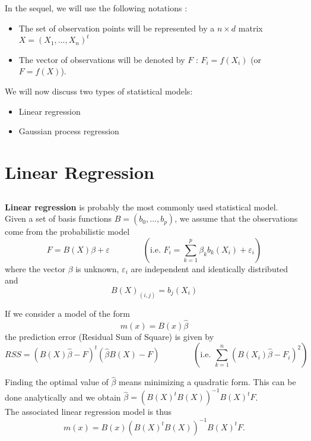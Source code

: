 \begin{frame}{}
In the sequel, we will use the following notations :
\begin{itemize}
	\item The set of observation points will be represented by a $n \times d$ matrix $X=(X_1, ..., X_n)^t$
	\item The vector of observations will be denoted by $F$ : $F_i=f(X_i)$ (or $F=f(X)$).
\end{itemize}
We will now discuss two types of statistical models:
\begin{itemize}
	\item Linear regression
	\item Gaussian process regression
\end{itemize}
\end{frame}

\section{Linear Regression}
\subsection{}

\begin{frame}{}
\textbf{Linear regression} is probably the most commonly used statistical model.\\ \vspace{3mm}
Given a set of basis functions $B=(b_0, \dots, b_p)$, we assume that the observations come from the probabilistic model
$$ F = B(X) \beta  + \varepsilon \qquad \qquad \left( \text{i.e. } F_i = \sum_{k=1}^p \beta_k b_k(X_i) + \varepsilon_i \right) $$
where the vector $\beta$ is unknown, $\varepsilon_i$ are independent and identically distributed and
$$ B(X)_{(i,j)}=b_j(X_i) $$
\end{frame}

\begin{frame}{}
If we consider a model of the form
$$m(x) = B(x) \hat{\beta}$$
the prediction error (Residual Sum of Square) is given by
$$RSS = (B(X) \hat{\beta}  - F)^t(\hat{\beta} B(X) - F)  \qquad \qquad \left( \text{i.e. } \sum_{k=1}^n ( B(X_i) \hat{\beta} - F_i)^2\right)$$

Finding the optimal value of $\hat{\beta}$ means minimizing a quadratic form. This can be done analytically and we obtain $\hat{\beta} = (B(X)^t B(X))^{-1} B(X)^t F$.\\
\vspace{3mm}
The associated linear regression model is thus
$$m(x) = B(x) (B(X)^t B(X))^{-1} B(X)^t F.$$
\end{frame}

